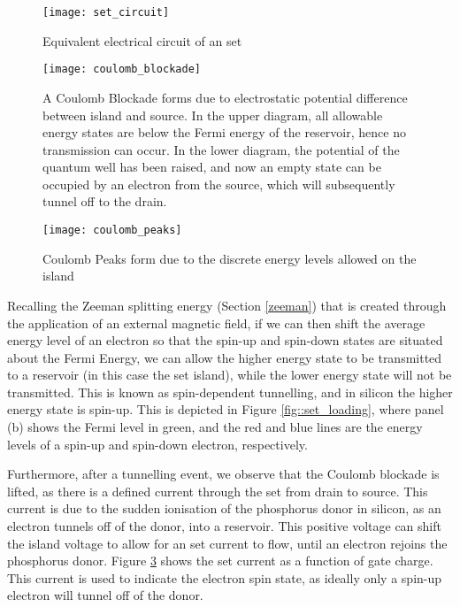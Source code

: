 	\begin{figure}[htbp!]
		\centering
		\texttt{[image: set\_circuit]}
		\caption[Equivalent circuit of an \gls{set}]{Equivalent electrical circuit of an \gls{set}\cite{devoret2000amplifying}}
		\label{fig::set_circuit}
	\end{figure}
	
	\begin{figure}[htbp!]
		\centering
		\texttt{[image: coulomb\_blockade]}
		\caption[A Coulomb Blockade]{A Coulomb Blockade \cite{coulomb_blockade} forms due to electrostatic potential difference between island and source. In the upper diagram, all allowable energy states are below the Fermi energy of the reservoir, hence no transmission can occur. In the lower diagram, the potential of the quantum well has been raised, and now an empty state can be occupied by an electron from the source, which will subsequently tunnel off to the drain.}
		\label{fig::coulomb_blockade}
	\end{figure}
	
	\begin{figure}[htbp!]
		\centering
		\texttt{[image: coulomb\_peaks]}
		\caption[Coulomb Peaks]{Coulomb Peaks form due to the discrete energy levels allowed on the island\cite{elec9705_lecture}}
		\label{fig::coulomb_peaks}
	\end{figure}
	
	
	
	Recalling the Zeeman splitting energy (Section \ref{zeeman}) that is created through the application of an external magnetic field, if we can then shift the average energy level of an electron so that the spin-up and spin-down states are situated about the Fermi Energy, we can allow the higher energy state to be transmitted to a reservoir (in this case the \gls{set} island), while the lower energy state will not be transmitted. This is known as spin-dependent tunnelling, and in silicon the higher energy state is spin-up. This is depicted in Figure \ref{fig::set_loading}, where panel (b) shows the Fermi level in green, and the red and blue lines are the energy levels of a spin-up and spin-down electron, respectively. 
	
	Furthermore, after a tunnelling event, we observe that the Coulomb blockade is lifted, as there is a defined current through the \gls{set} from drain to source. This current is due to the sudden ionisation of the phosphorus donor in silicon, as an electron tunnels off of the donor, into a reservoir. This positive voltage can shift the island voltage to allow for an \gls{set} current to flow, until an electron rejoins the phosphorus donor. Figure \ref{fig::coulomb_peaks} shows the \gls{set} current as a function of gate charge. This current is used to indicate the electron spin state, as ideally only a spin-up electron will tunnel off of the donor.
	
